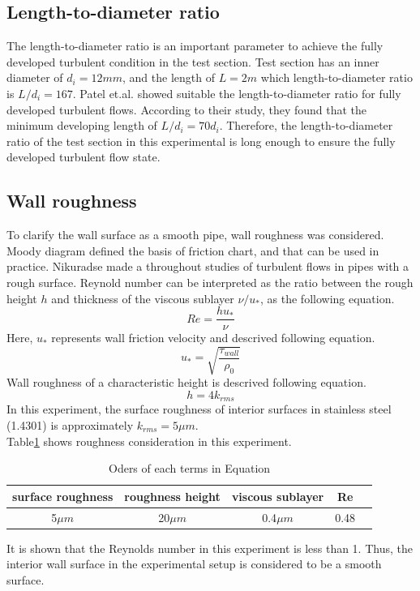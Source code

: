 \documentclass[conference]{IEEEtran}
\begin{document}
\subsection{Length-to-diameter ratio}
The length-to-diameter ratio is an important parameter to achieve the fully developed turbulent condition in the test section.
Test section has an inner diameter of $d_{i}=12mm$, and the length of $L=2m$ which length-to-diameter ratio is $L/d_{i}=167$.
Patel et.al.\cite{Patel1969} showed suitable the length-to-diameter ratio for fully developed turbulent flows.
According to their study, they found that the minimum developing length of $L/d_{i}=70d_{i}$.
Therefore, the length-to-diameter ratio of the test section in this experimental is long enough to ensure the fully developed turbulent flow state.


\subsection{Wall roughness}
To clarify the wall surface as a smooth pipe, wall roughness was considered.
Moody diagram defined the basis of friction chart, and that can be used in practice.
Nikuradse made a throughout studies of turbulent flows in pipes with a rough surface.
Reynold number can be interpreted as the ratio between the rough height $h$ and thickness of the viscous sublayer $\nu/u_{*}$, as the following equation.
\begin{equation}
    Re=\frac{hu_{*}}{\nu}
\end{equation}
Here, $u_{*}$ represents wall friction velocity and descrived following equation.
\begin{equation}
    u_{*}=\sqrt{\frac{\tau_{wall}}{\rho_{0}}}
\end{equation}
Wall roughness of a characteristic height is descrived following equation.
\begin{equation}
    h = 4k_{rms}
\end{equation}
In this experiment, the surface roughness of interior surfaces in stainless steel (1.4301) is approximately $k_{rms} = 5\mu m$.\\
Table\ref{wall_roughness} shows roughness consideration in this experiment.
\begin{table}[h]
    \caption{Oders of each terms in Equation}
    \label{wall_roughness}
    \centering
    \begin{tabular}{ccccc}
        \hline
        surface roughness & roughness height & viscous sublayer & Re \\
        \hline
        5$\mu m$ & 20$\mu m$ & 0.4$\mu m$ & 0.48
    \end{tabular}
\end{table}
It is shown that the Reynolds number in this experiment is less than 1.
Thus, the interior wall surface in the experimental setup is considered to be a smooth surface.
\end{document}
